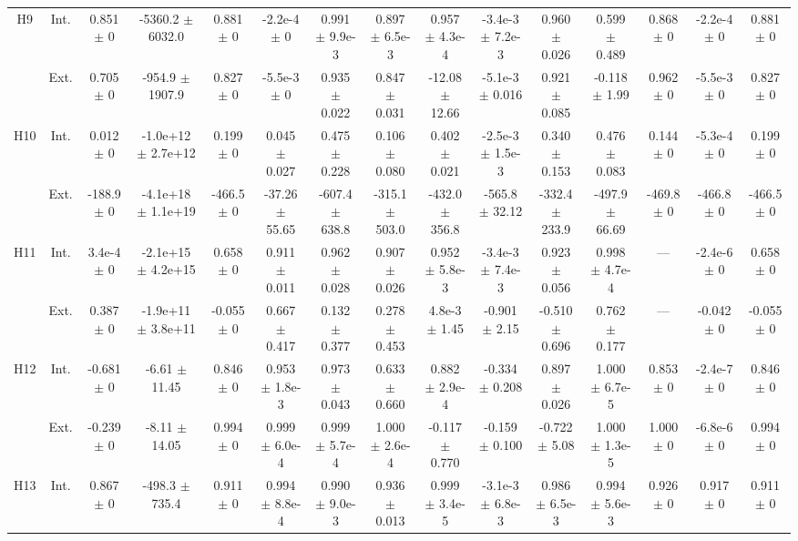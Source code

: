 \begin{table}[htbp]
{\begin{tabular}{@{}ccccccccccccccc@{}}
\cline{2-15}
\multirow{2}{*}{H9} & Int. & 0.851 $\pm$ 0 & -5360.2 $\pm$ 6032.0 & 0.881 $\pm$ 0 & -2.2e-4 $\pm$ 0 & 0.991 $\pm$ 9.9e-3 & 0.897 $\pm$ 6.5e-3 & 0.957 $\pm$ 4.3e-4 & -3.4e-3 $\pm$ 7.2e-3 & 0.960 $\pm$ 0.026 & 0.599 $\pm$ 0.489 & 0.868 $\pm$ 0 & -2.2e-4 $\pm$ 0 & 0.881 $\pm$ 0 \\
 & Ext. & 0.705 $\pm$ 0 & -954.9 $\pm$ 1907.9 & 0.827 $\pm$ 0 & -5.5e-3 $\pm$ 0 & 0.935 $\pm$ 0.022 & 0.847 $\pm$ 0.031 & -12.08 $\pm$ 12.66 & -5.1e-3 $\pm$ 0.016 & 0.921 $\pm$ 0.085 & -0.118 $\pm$ 1.99 & 0.962 $\pm$ 0 & -5.5e-3 $\pm$ 0 & 0.827 $\pm$ 0 \\
\cline{2-15}
\multirow{2}{*}{H10} & Int. & 0.012 $\pm$ 0 & -1.0e+12 $\pm$ 2.7e+12 & 0.199 $\pm$ 0 & 0.045 $\pm$ 0.027 & 0.475 $\pm$ 0.228 & 0.106 $\pm$ 0.080 & 0.402 $\pm$ 0.021 & -2.5e-3 $\pm$ 1.5e-3 & 0.340 $\pm$ 0.153 & 0.476 $\pm$ 0.083 & 0.144 $\pm$ 0 & -5.3e-4 $\pm$ 0 & 0.199 $\pm$ 0 \\
 & Ext. & -188.9 $\pm$ 0 & -4.1e+18 $\pm$ 1.1e+19 & -466.5 $\pm$ 0 & -37.26 $\pm$ 55.65 & -607.4 $\pm$ 638.8 & -315.1 $\pm$ 503.0 & -432.0 $\pm$ 356.8 & -565.8 $\pm$ 32.12 & -332.4 $\pm$ 233.9 & -497.9 $\pm$ 66.69 & -469.8 $\pm$ 0 & -466.8 $\pm$ 0 & -466.5 $\pm$ 0 \\
\cline{2-15}
\multirow{2}{*}{H11} & Int. & 3.4e-4 $\pm$ 0 & -2.1e+15 $\pm$ 4.2e+15 & 0.658 $\pm$ 0 & 0.911 $\pm$ 0.011 & 0.962 $\pm$ 0.028 & 0.907 $\pm$ 0.026 & 0.952 $\pm$ 5.8e-3 & -3.4e-3 $\pm$ 7.4e-3 & 0.923 $\pm$ 0.056 & 0.998 $\pm$ 4.7e-4 & --- & -2.4e-6 $\pm$ 0 & 0.658 $\pm$ 0 \\
 & Ext. & 0.387 $\pm$ 0 & -1.9e+11 $\pm$ 3.8e+11 & -0.055 $\pm$ 0 & 0.667 $\pm$ 0.417 & 0.132 $\pm$ 0.377 & 0.278 $\pm$ 0.453 & 4.8e-3 $\pm$ 1.45 & -0.901 $\pm$ 2.15 & -0.510 $\pm$ 0.696 & 0.762 $\pm$ 0.177 & --- & -0.042 $\pm$ 0 & -0.055 $\pm$ 0 \\
\cline{2-15}
\multirow{2}{*}{H12} & Int. & -0.681 $\pm$ 0 & -6.61 $\pm$ 11.45 & 0.846 $\pm$ 0 & 0.953 $\pm$ 1.8e-3 & 0.973 $\pm$ 0.043 & 0.633 $\pm$ 0.660 & 0.882 $\pm$ 2.9e-4 & -0.334 $\pm$ 0.208 & 0.897 $\pm$ 0.026 & 1.000 $\pm$ 6.7e-5 & 0.853 $\pm$ 0 & -2.4e-7 $\pm$ 0 & 0.846 $\pm$ 0 \\
 & Ext. & -0.239 $\pm$ 0 & -8.11 $\pm$ 14.05 & 0.994 $\pm$ 0 & 0.999 $\pm$ 6.0e-4 & 0.999 $\pm$ 5.7e-4 & 1.000 $\pm$ 2.6e-4 & -0.117 $\pm$ 0.770 & -0.159 $\pm$ 0.100 & -0.722 $\pm$ 5.08 & 1.000 $\pm$ 1.3e-5 & 1.000 $\pm$ 0 & -6.8e-6 $\pm$ 0 & 0.994 $\pm$ 0 \\
\cline{2-15}
\multirow{2}{*}{H13} & Int. & 0.867 $\pm$ 0 & -498.3 $\pm$ 735.4 & 0.911 $\pm$ 0 & 0.994 $\pm$ 8.8e-4 & 0.990 $\pm$ 9.0e-3 & 0.936 $\pm$ 0.013 & 0.999 $\pm$ 3.4e-5 & -3.1e-3 $\pm$ 6.8e-3 & 0.986 $\pm$ 6.5e-3 & 0.994 $\pm$ 5.6e-3 & 0.926 $\pm$ 0 & 0.917 $\pm$ 0 & 0.911 $\pm$ 0 \\

\end{tabular}}
\end{table}
